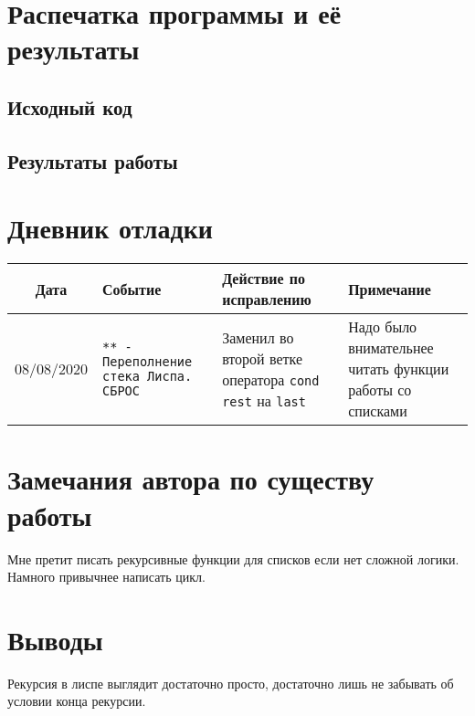 \documentclass[12pt]{article}
\begin{document}
\section{Распечатка программы и её результаты}

\subsection{Исходный код}

\subsection{Результаты работы}

\section{Дневник отладки}
\noindent
\begin{tabularx}{\linewidth}{|c|X|X|X|}
\hline
Дата & Событие & Действие по исправлению & Примечание \\
\hline
08/08/2020 & {\tt *** - Переполнение стека Лиспа. СБРОС} & Заменил во второй ветке оператора {\tt cond} {\tt rest} на {\tt last} & Надо было внимательнее читать функции работы со списками\\
\hline
\end{tabularx}

\section{Замечания автора по существу работы}

Мне претит писать рекурсивные функции для списков если нет сложной логики.
Намного привычнее написать цикл.

\section{Выводы}

Рекурсия в лиспе выглядит достаточно просто,
достаточно лишь не забывать об условии конца рекурсии.
\end{document}
